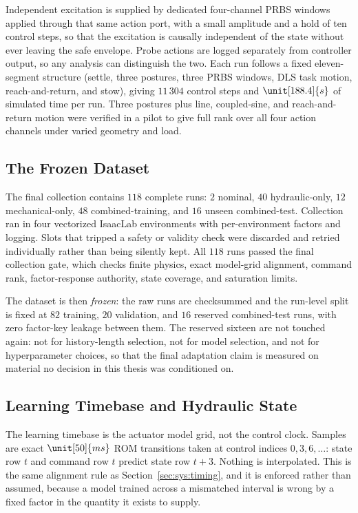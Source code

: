 Independent excitation is supplied by dedicated four-channel PRBS
windows applied through that same action port, with a small amplitude
and a hold of ten control steps, so that the excitation is causally
independent of the state without ever leaving the safe envelope. Probe
actions are logged separately from controller output, so any analysis
can distinguish the two. Each run follows a fixed eleven-segment structure
(settle, three postures, three PRBS windows, DLS task motion,
reach-and-return, and stow), giving $11\,304$ control steps
and $\unit[188.4]{s}$ of simulated time per run. Three postures plus
line, coupled-sine, and reach-and-return motion were verified in a pilot
to give full rank over all four action channels under varied geometry
and load.

\subsection{The Frozen Dataset}

The final collection contains $118$ complete runs: $2$ nominal, $40$
hydraulic-only, $12$ mechanical-only, $48$ combined-training, and $16$
unseen combined-test. Collection ran in four vectorized IsaacLab
environments with per-environment factors and logging. Slots that
tripped a safety or validity check were discarded and retried
individually rather than being silently kept. All $118$ runs passed the
final collection gate, which checks finite physics, exact model-grid
alignment, command rank, factor-response authority, state coverage, and
saturation limits.

The dataset is then \emph{frozen}: the raw runs are checksummed and the
run-level split is fixed at $82$ training, $20$ validation, and $16$
reserved combined-test runs, with zero factor-key leakage between them.
The reserved sixteen are not touched again:
not for history-length selection, not for model selection, and not for
hyperparameter choices, so that the final adaptation claim is measured on material no decision
in this thesis was conditioned on.

\subsection{Learning Timebase and Hydraulic State}

The learning timebase is the actuator model grid, not the control clock.
Samples are exact $\unit[50]{ms}$ ROM transitions taken at control
indices $0, 3, 6, \dots$: state row $t$ and command row $t$ predict
state row $t+3$. Nothing is interpolated. This is the same alignment
rule as Section~\ref{sec:sys:timing}, and it is enforced rather than
assumed, because a model trained across a mismatched interval is wrong by a fixed factor in the quantity it exists to supply.


